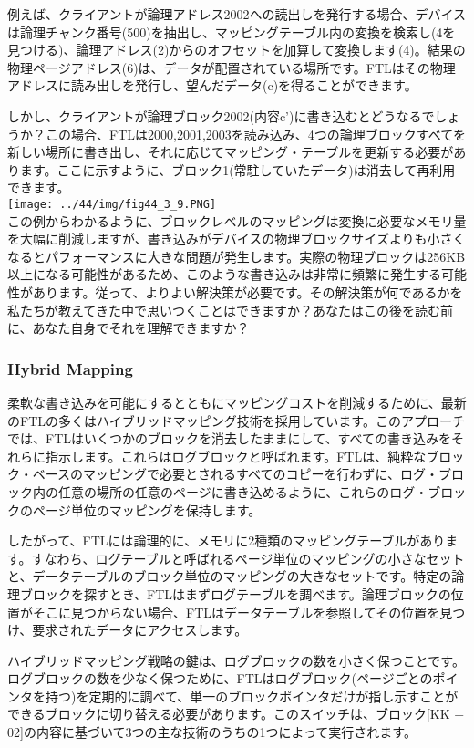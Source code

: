 例えば、クライアントが論理アドレス2002への読出しを発行する場合、デバイスは論理チャンク番号(500)を抽出し、マッピングテーブル内の変換を検索し(4を見つける)、論理アドレス(2)からのオフセットを加算して変換します(4)。結果の物理ページアドレス(6)は、データが配置されている場所です。FTLはその物理アドレスに読み出しを発行し、望んだデータ(c)を得ることができます。

しかし、クライアントが論理ブロック2002(内容c')に書き込むとどうなるでしょうか？この場合、FTLは2000,2001,2003を読み込み、4つの論理ブロックすべてを新しい場所に書き出し、それに応じてマッピング・テーブルを更新する必要があります。ここに示すように、ブロック1(常駐していたデータ)は消去して再利用できます。\\
\texttt{[image: ../44/img/fig44\_3\_9.PNG]}\\
この例からわかるように、ブロックレベルのマッピングは変換に必要なメモリ量を大幅に削減しますが、書き込みがデバイスの物理ブロックサイズよりも小さくなるとパフォーマンスに大きな問題が発生します。実際の物理ブロックは256KB以上になる可能性があるため、このような書き込みは非常に頻繁に発生する可能性があります。従って、よりよい解決策が必要です。その解決策が何であるかを私たちが教えてきた中で思いつくことはできますか？あなたはこの後を読む前に、あなた自身でそれを理解できますか？

\hypertarget{hybrid-mapping}{%
\subsubsection*{Hybrid Mapping}\label{hybrid-mapping}}

柔軟な書き込みを可能にするとともにマッピングコストを削減するために、最新のFTLの多くはハイブリッドマッピング技術を採用しています。このアプローチでは、FTLはいくつかのブロックを消去したままにして、すべての書き込みをそれらに指示します。これらはログブロックと呼ばれます。FTLは、純粋なブロック・ベースのマッピングで必要とされるすべてのコピーを行わずに、ログ・ブロック内の任意の場所の任意のページに書き込めるように、これらのログ・ブロックのページ単位のマッピングを保持します。

したがって、FTLには論理的に、メモリに2種類のマッピングテーブルがあります。すなわち、ログテーブルと呼ばれるページ単位のマッピングの小さなセットと、データテーブルのブロック単位のマッピングの大きなセットです。特定の論理ブロックを探すとき、FTLはまずログテーブルを調べます。論理ブロックの位置がそこに見つからない場合、FTLはデータテーブルを参照してその位置を見つけ、要求されたデータにアクセスします。

ハイブリッドマッピング戦略の鍵は、ログブロックの数を小さく保つことです。ログブロックの数を少なく保つために、FTLはログブロック(ページごとのポインタを持つ)を定期的に調べて、単一のブロックポインタだけが指し示すことができるブロックに切り替える必要があります。このスイッチは、ブロック{[}KK
+ 02{]}の内容に基づいて3つの主な技術のうちの1つによって実行されます。

